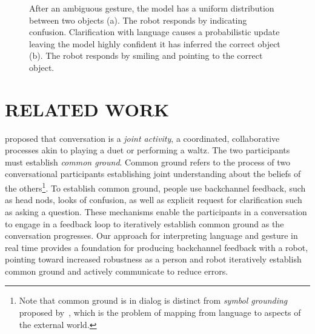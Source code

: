 \documentclass[letterpaper, 10 pt, conference]{ieeeconf}
\begin{document}
\begin{figure}
\centering
{}
\caption{After an ambiguous gesture, the model has a uniform
  distribution between two objects (a).  The robot responds by
  indicating confusion.  Clarification with language causes a
  probabilistic update leaving the model highly confident it has
  inferred the correct object (b).  The robot responds by smiling and
  pointing to the correct object. \label{fig:cartoon}}
\end{figure}

\section{RELATED WORK}

\citet{clark96} proposed that conversation is a {\em joint activity},
a coordinated, collaborative processes akin to playing a duet or
performing a waltz.  The two participants must establish {\em common
  ground}.  Common ground refers to the process of two conversational
participants establishing joint understanding about the beliefs of the
others\footnote{Note that common ground is in dialog is distinct from
  {\em symbol grounding} proposed by~\citet{harnad90}, which is the
  problem of mapping from language to aspects of the external world.}.
To establish common ground, people use backchannel feedback, such as
head nods, looks of confusion, as well as explicit request for
clarification such as asking a question.  These mechanisms enable the
participants in a conversation to engage in a feedback loop to
iteratively establish common ground as the conversation progresses.
Our approach for interpreting language and gesture in real time
provides a foundation for producing backchannel feedback with a robot,
pointing toward increased robustness as a person and robot iteratively
establish common ground and actively communicate to reduce errors.
\end{document}
